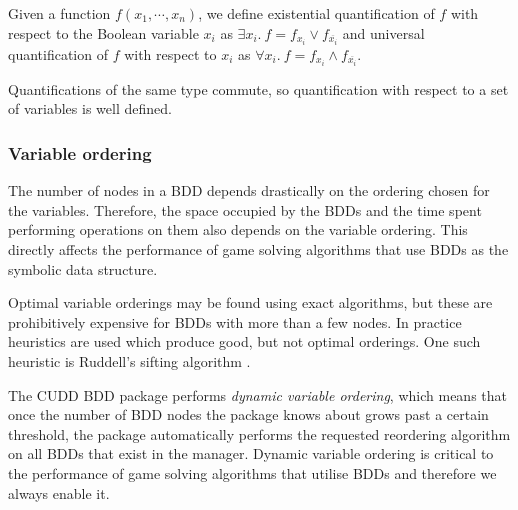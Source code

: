Given a function $f(x_1,\cdots,x_n)$, we define existential quantification of $f$ with respect to the Boolean variable $x_i$ as $\exists x_i.\ f = f_{x_i} \vee f_{\overline{x_i}}$ and universal quantification of $f$ with respect to $x_i$ as $\forall x_i.\ f = f_{x_i} \wedge f_{\overline{x_i}}$.

Quantifications of the same type commute, so quantification with respect to a set of variables is well defined. 

\subsubsection{Variable ordering}

The number of nodes in a BDD depends drastically on the ordering chosen for the variables. Therefore, the space occupied by the BDDs and the time spent performing operations on them also depends on the variable ordering. This directly affects the performance of game solving algorithms that use BDDs as the symbolic data structure. 

Optimal variable orderings may be found using exact algorithms, but these are prohibitively expensive for BDDs with more than a few nodes. In practice heuristics are used which produce good, but not optimal orderings. One such heuristic is Ruddell's sifting algorithm \cite{Rudell_1993}.

The CUDD BDD package performs \emph{dynamic variable ordering}, which means that once the number of BDD nodes the package knows about grows past a certain threshold, the package automatically performs the requested reordering algorithm on all BDDs that exist in the manager. Dynamic variable ordering is critical to the performance of game solving algorithms that utilise BDDs and therefore we always enable it.

